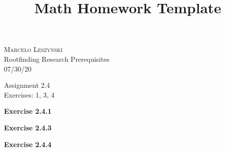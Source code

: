\documentclass[12pt,oneside]{article}
\newenvironment{exercise}[1]{\vspace{.1in}\noindent\textbf{Exercise #1 \hspace{.05em}}}{}
\begin{document}
\title{Math Homework Template}

\begin{flushright}
\textsc{Marcelo Leszynski}  \\
Rootfinding Research Prerequisites\\
07/30/20
\end{flushright}

\begin{center}
\textsf{Assignment 2.4 } \\
\textsf{Exercises: 1, 3, 4 }
\end{center}


\begin{exercise}{2.4.1}

\end{exercise}


\begin{exercise}{2.4.3}

\end{exercise}


\begin{exercise}{2.4.4}

\end{exercise}


\end{document}
